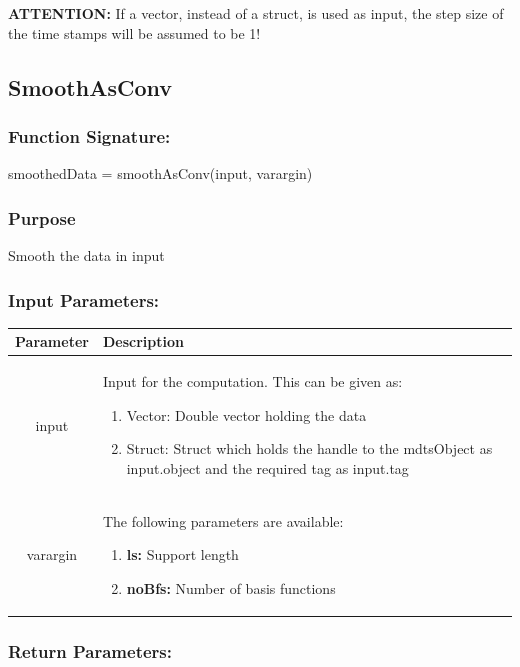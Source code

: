 \documentclass[a4]{scrreprt}
\begin{document}
\textbf{ATTENTION:} If a vector, instead of a struct, is used as input, the step size of the time stamps will be assumed to be 1! 

\subsection{SmoothAsConv}

\subsubsection{Function Signature:}

\begin{center}
	smoothedData = smoothAsConv(input, varargin)
\end{center}

\subsubsection{Purpose}

Smooth the data in input

\subsubsection{Input Parameters:}

\begin{longtabu} to \textwidth {|c|X|}
	\hline
	\textbf{Parameter} & \textbf{Description} \\ \hline
	\endhead
	input & Input for the computation. This can be given as:
	\begin{enumerate}
		\item Vector: Double vector holding the data
		\item Struct: Struct which holds the handle to the mdtsObject as input.object and the required tag as input.tag 
	\end{enumerate} \\ \hline
	varargin & The following parameters are available:
	\begin{enumerate}
		\item \textbf{ls:} Support length
		\item \textbf{noBfs:} Number of basis functions
	\end{enumerate} \\ \hline
\end{longtabu}

\subsubsection{Return Parameters:}
\end{document}
